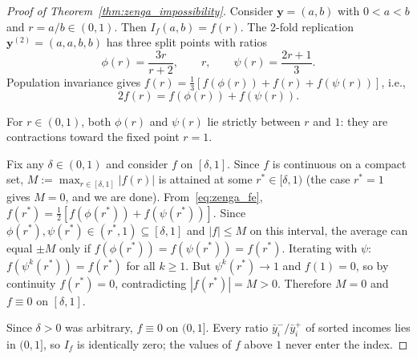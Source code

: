 \documentclass[12pt]{article}
\theoremstyle{plain}
\theoremstyle{definition}
\theoremstyle{remark}
\newcommand{\bfy}{\mathbf{y}}
\begin{document}
\begin{proof}[Proof of Theorem~\ref{thm:zenga_impossibility}]
Consider $\bfy = (a, b)$ with $0 < a < b$ and $r = a/b \in (0, 1)$.
Then $I_f(a, b) = f(r)$.
The 2-fold replication $\bfy^{(2)} = (a, a, b, b)$ has three split points with ratios
\[
\phi(r) = \frac{3r}{r+2}, \qquad r, \qquad \psi(r) = \frac{2r+1}{3}.
\]
Population invariance gives $f(r) = \tfrac{1}{3}[f(\phi(r)) + f(r) + f(\psi(r))]$, i.e.,
\begin{equation}\label{eq:zenga_fe}
2f(r) = f(\phi(r)) + f(\psi(r)).
\end{equation}

For $r \in (0, 1)$, both $\phi(r)$ and $\psi(r)$ lie strictly between $r$ and $1$: they are contractions toward the fixed point $r = 1$.

Fix any $\delta \in (0, 1)$ and consider $f$ on $[\delta, 1]$.
Since $f$ is continuous on a compact set, $M := \max_{r \in [\delta, 1]} |f(r)|$ is attained at some $r^* \in [\delta, 1)$ (the case $r^* = 1$ gives $M = 0$, and we are done).
From~\eqref{eq:zenga_fe}, $f(r^*) = \tfrac{1}{2}[f(\phi(r^*)) + f(\psi(r^*))]$.
Since $\phi(r^*), \psi(r^*) \in (r^*, 1) \subseteq [\delta, 1]$ and $|f| \leq M$ on this interval, the average can equal $\pm M$ only if $f(\phi(r^*)) = f(\psi(r^*)) = f(r^*)$.
Iterating with $\psi$: $f(\psi^k(r^*)) = f(r^*)$ for all $k \geq 1$.
But $\psi^k(r^*) \to 1$ and $f(1) = 0$, so by continuity $f(r^*) = 0$, contradicting $|f(r^*)| = M > 0$.
Therefore $M = 0$ and $f \equiv 0$ on $[\delta, 1]$.

Since $\delta > 0$ was arbitrary, $f \equiv 0$ on $(0, 1]$.
Every ratio $\bar{y}^{-}_i/\bar{y}^{+}_i$ of sorted incomes lies in $(0, 1]$, so $I_f$ is identically zero; the values of $f$ above $1$ never enter the index.
\end{proof}
\end{document}
